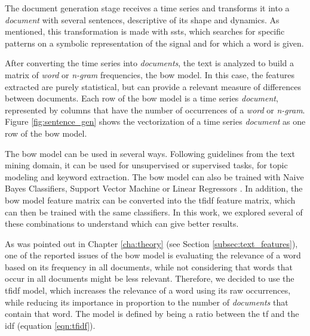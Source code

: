 The document generation stage receives a time series and transforms it into a \textit{document} with several sentences, descriptive of its shape and dynamics. As mentioned, this transformation is made with \gls{ssts}, which searches for specific patterns on a symbolic representation of the signal and for which a word is given.  
\par
After converting the time series into \textit{documents}, the text is analyzed to build a matrix of \textit{word} or \textit{n-gram} frequencies, the \gls{bow} model. In this case, the features extracted are purely statistical, but can provide a relevant measure of differences between documents. Each row of the \gls{bow} model is a time series \textit{document}, represented by columns that have the number of occurrences of a \textit{word} or \textit{n-gram}. Figure \ref{fig:sentence_gen} shows the vectorization of a time series \textit{document} as one row of the \gls{bow} model.

The \gls{bow} model can be used in several ways. Following guidelines from the text mining domain, it can be used for unsupervised or supervised tasks, for topic modeling and keyword extraction. The \gls{bow} model can also be trained with Naive Bayes Classifiers, Support Vector Machine or Linear Regressors \cite{scikit-learn}. In addition, the \gls{bow} model feature matrix can be converted into the \gls{tfidf} feature matrix, which can then be trained with the same classifiers. In this work, we explored several of these combinations to understand which can give better results.
\par
As was pointed out in Chapter \ref{cha:theory} (see Section \ref{subsec:text_features}), one of the reported issues of the \gls{bow} model is evaluating the relevance of a word based on its frequency in all documents, while not considering that words that occur in all documents might be less relevant. Therefore, we decided to use the \gls{tfidf} model, which increases the relevance of a word using its raw occurrences, while reducing its importance in proportion to the number of \textit{documents} that contain that word. The model is defined by being a ratio between the \gls{tf} and the \gls{idf} (equation \ref{eqn:tfidf}).


